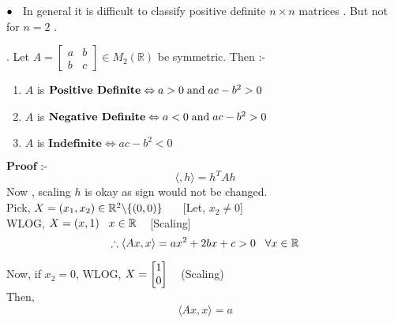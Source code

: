 \documentclass[Analysis-3]{subfiles}
\begin{document}
$\bullet \hspace{2mm} $ In general it is difficult to classify positive definite $n \times n$ matrices . But not for $n = 2$ .

\begin{Thm}{}
    . Let $A = \begin{bmatrix}
        a & b \\
        b & c
    \end{bmatrix} \in M_2(\mathbb{R}) $ be symmetric. Then :-

    \begin{enumerate}
        \item $A$ is $\textbf{Positive Definite} \Leftrightarrow a > 0 \hspace{1mm} \text{and} \hspace{1mm} ac -b^2 >0 $ 
        \item $A$ is $\textbf{Negative Definite} \Leftrightarrow a < 0 \hspace{1mm} \text{and} \hspace{1mm} ac -b^2 >0 $ 
        \item $A$ is $\textbf{Indefinite} \Leftrightarrow ac -b^2 <0 $ 
    \end{enumerate}
\end{Thm}

$\textbf{Proof :-}$ \[ \langle, h \rangle = h^TAh\]
Now , scaling $h$ is okay as sign would not be changed. \\

Pick, $X = (x_1 , x_2) \in \mathbb{R}^2 \backslash \{(0,0)\} \hspace{5mm}$ [Let, $x_2 \neq 0$] \\
WLOG, $X = (x,1) \hspace{3mm} x \in \mathbb{R} \hspace{3mm}$ [Scaling] \\
\[\therefore \langle Ax, x \rangle = ax^2 + 2bx + c > 0 \hspace{3mm} \forall x \in \mathbb{R}\]

Now, if $x_2 = 0$, WLOG, $X = \begin{bmatrix}
    1 \\
    0
\end{bmatrix} \hspace{3mm}$ (Scaling) \\

Then, \[ \langle Ax, x \rangle = a \]
\end{document}
